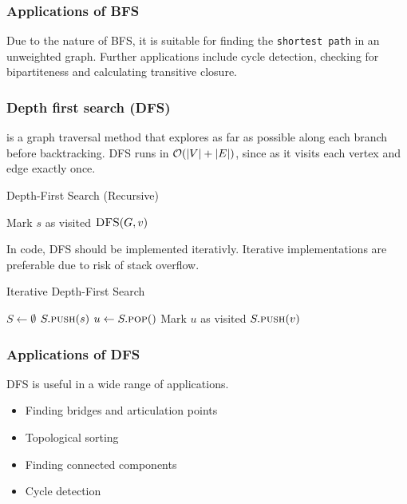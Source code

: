 \documentclass[a3paper, landscape, 11pt]{article} %
\begin{document}
\begin{multicols*}{4}
\subsubsection*{Applications of BFS}
Due to the nature of BFS, it is suitable for finding the \texttt{shortest path} in an unweighted graph. Further applications include cycle detection, checking for bipartiteness and calculating transitive closure.

\subsubsection*{Depth first search (DFS)}

 is a graph traversal method that explores as far as possible along each branch before backtracking. DFS runs in $\mathcal{O}(|V|+|E|)$, since as it visits each vertex and edge exactly once.

\begin{algorithm}[H]
\caption{Depth-First Search (Recursive)}
\begin{algorithmic}[1]
\State Mark $s$ as visited 
\State $\textsc{DFS}(G, v)$
\EndIf
\EndFor{}
\EndProcedure
\end{algorithmic}
\end{algorithm}

In code, DFS should be implemented iterativly. Iterative implementations are preferable due to risk of stack overflow.

\begin{algorithm}[H]
\caption{Iterative Depth-First Search}
\begin{algorithmic}[1]
\State $S \gets \emptyset$ 
\State $S.\textsc{push}(s)$
\State $u \gets S.\textsc{pop}()$
\State Mark $u$ as visited
\State $S.\textsc{push}(v)$
\EndFor
\EndIf
\EndWhile
\EndProcedure
\end{algorithmic}
\end{algorithm}

\subsubsection*{Applications of DFS}
DFS is useful in a wide range of applications.
\begin{itemize}[noitemsep, label=-]
  \item Finding bridges and articulation points
  \item Topological sorting
  \item Finding connected components
  \item Cycle detection
\end{itemize}


\end{multicols*}
\end{document}
